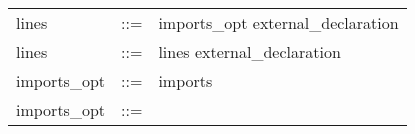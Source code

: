 \begin{longtable}{lrl}
lines                                      & ::= &
  \begin{minipage}[t]{\rulerhs}
    \raggedright
    imports\_opt external\_declaration
  \end{minipage}                                                             \\
lines                                      & ::= &
  \begin{minipage}[t]{\rulerhs}
    \raggedright
    lines external\_declaration
  \end{minipage}                                                             \\
imports\_opt                               & ::= &
  \begin{minipage}[t]{\rulerhs}
    \raggedright
    imports
  \end{minipage}                                                             \\
imports\_opt                               & ::= &
  \begin{minipage}[t]{\rulerhs}
    \raggedright
    

\end{minipage}
\end{longtable}
